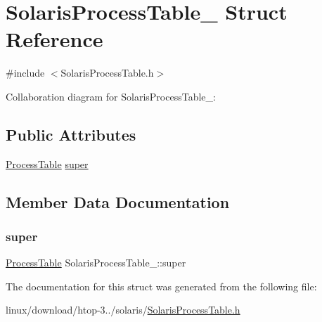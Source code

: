 \hypertarget{structSolarisProcessTable__}{}\section{Solaris\+Process\+Table\+\_\+ Struct Reference}
\label{structSolarisProcessTable__}


{\ttfamily \#include $<$Solaris\+Process\+Table.\+h$>$}



Collaboration diagram for Solaris\+Process\+Table\+\_\+\+:
\subsection*{Public Attributes}
\begin{DoxyCompactItemize}
\item 
\hyperlink{ProcessTable_8h_a54ec62da6f9d80d4d06e3845a2597a80}{Process\+Table} \hyperlink{structSolarisProcessTable___a80d98b6f6a9e08299b91395f5a40661e}{super}
\end{DoxyCompactItemize}


\subsection{Member Data Documentation}
\mbox{\label{structSolarisProcessTable___a80d98b6f6a9e08299b91395f5a40661e}} 
\subsubsection{\texorpdfstring{super}{super}}
{\footnotesize\ttfamily \hyperlink{ProcessTable_8h_a54ec62da6f9d80d4d06e3845a2597a80}{Process\+Table} Solaris\+Process\+Table\+\_\+\+::super}



The documentation for this struct was generated from the following file\+:\begin{DoxyCompactItemize}
\item 
linux/download/htop-\/3../solaris/\hyperlink{SolarisProcessTable_8h}{Solaris\+Process\+Table.\+h}\end{DoxyCompactItemize}
